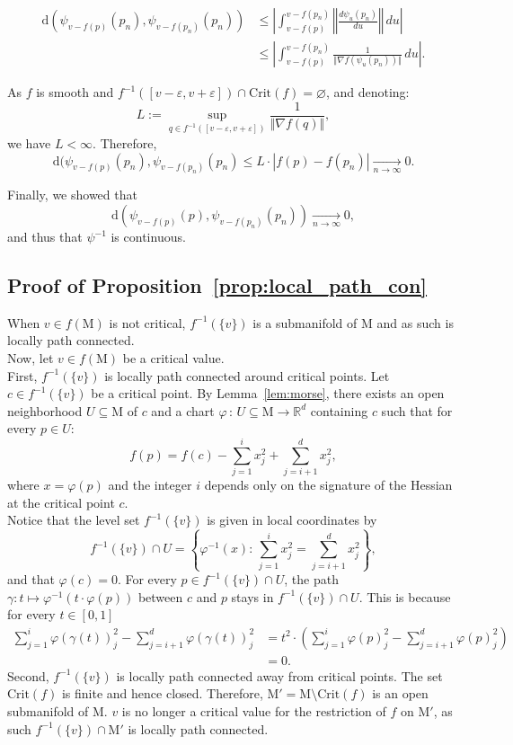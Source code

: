\documentclass[pdflatex,sn-mathphys-ay]{sn-jnl}%
\newcommand{\man}{\mathrm{M}}
\newcommand{\dis}{\mathrm{d}}
\newcommand{\critic}{{\mathrm {Crit}}}
\newcommand{\converge}{\underset{n\rightarrow\infty}{\longrightarrow}}
\newcommand{\eps}{\varepsilon}
\newcommand{\preim}[2]{#1^{-1}(#2)}
\newcommand{\change}[1]{\noindent #1}
\theoremstyle{thmstyleone}%
\begin{document}
\begin{appendices}
\begin{align*}
 \dis(\psi_{v-f(p)}(p_n),\psi_{v-f(p_n)}(p_n))&\leq \left|\int_{v-f(p)}^{v-f(p_n)}\left\Vert\frac{d\psi_{u}(p_n)}{du}\right\Vert\,du \right| \\
 &\leq \left|\int_{v-f(p)}^{v-f(p_n)}\frac{1}{\Vert\nabla f(\psi_{u}(p_n))\Vert}\,du \right|.
\end{align*}

As $f$ is smooth and $\preim{f}{[v-\eps,v+\eps]}\cap\critic(f)=\varnothing$, and  denoting:
$$L:=\sup_{q\in \preim{f}{[v-\eps,v+\eps]}}\frac{1}{\Vert\nabla f(q)\Vert},$$
we have $L<\infty$. Therefore,
$$\dis(\psi_{v-f(p)}(p_n),\psi_{v-f(p_n)}(p_n)\leq L\cdot |f(p)-f(p_n)|\converge 0.$$

Finally, we showed that $$\dis(\psi_{v-f(p)}(p),\psi_{v-f(p_n)}(p_n))\converge 0,$$ and thus that $\psi^{-1}$ is continuous.

\subsection{Proof of Proposition~\ref{prop:local_path_con}}

When $v\in f(\man)$ is not critical, $\preim{f}{\{v\}}$ is a submanifold of $\man$ and as such is locally path connected.\\
Now, let $v\in f(\man)$ be a critical value.\\
\change{First, $\preim{f}{\{v\}}$ is locally path connected around critical points. Let $c\in\preim{f}{\{v\}}$ be a critical point.} By Lemma~\ref{lem:morse}, there exists an open neighborhood $U\subseteq\man$ of $c$ and a chart $\varphi\,:\,U\subseteq\man\rightarrow \mathbb{R}^d$ containing $c$ such that for every $p\in U$:
$$f(p)=f(c)-\sum_{j=1}^ix_j^2+\sum_{j=i+1}^dx_j^2,$$
where $x=\varphi(p)$ and the integer $i$ depends only on the signature of the Hessian at the critical point $c$.\\
Notice that the level set $\preim{f}{\{v\}}$ is given in local coordinates by 
$$\preim{f}{\{v\}}\cap U=\left\{\varphi^{-1}(x):\,\sum_{j=1}^ix_j^2=\sum_{j=i+1}^dx_j^2\right\},$$
and that $\varphi(c)=0$. For every $p\in\preim{f}{\{v\}}\cap U$, the path $\gamma\colon t\mapsto \varphi^{-1}(t\cdot\varphi(p))$ between $c$ and $p$ stays in $\preim{f}{\{v\}}\cap U$. This is because for every $t\in[0,1]$
\begin{align*}
\sum_{j=1}^i\varphi(\gamma(t))_j^2-\sum_{j=i+1}^d\varphi(\gamma(t))_j^2&=t^2\cdot\left(\sum_{j=1}^i\varphi(p)_j^2-\sum_{j=i+1}^d\varphi(p)_j^2\right)\\
&=0.
\end{align*}
\change{Second, $\preim{f}{\{v\}}$ is locally path connected away from critical points. The set $\critic(f)$ is finite and hence closed.} Therefore, $\man'=\man\setminus\critic(f)$ is an open submanifold of $\man$. $v$ is no longer a critical value for the restriction of $f$ on $\man'$, as such $\preim{f}{\{v\}}\cap\man'$ is locally path connected.


\end{appendices}
\end{document}
